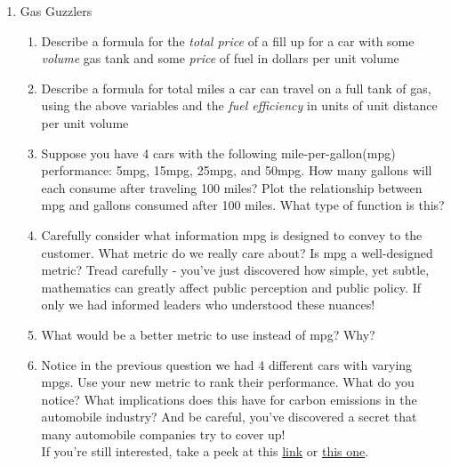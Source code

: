 \documentclass{article}
\begin{document}
\begin{enumerate}
    \item Gas Guzzlers
    \begin{enumerate}
        \item Describe a formula for the \textit{total price} of a fill up for a car with some  \textit{volume} gas tank and some  \textit{price} of fuel in dollars per unit volume
        \item Describe a formula for total miles a car can travel on a full tank of gas, using the above variables and the \textit{fuel efficiency} in units of unit distance per unit volume
        \item Suppose you have 4 cars with the following mile-per-gallon(mpg) performance: 5mpg, 15mpg, 25mpg, and 50mpg. How many gallons will each consume after traveling 100 miles? Plot the relationship between mpg and gallons consumed after 100 miles. What type of function is this?
        \item Carefully consider what information mpg is designed to convey to the customer. What metric do we really care about? Is mpg a well-designed metric? Tread carefully - you've just discovered how simple, yet subtle, mathematics can greatly affect public perception and public policy. If only we had informed leaders who understood these nuances!
        \item What would be a better metric to use instead of mpg? Why?
        \item Notice in the previous question we had 4 different cars with varying mpgs. Use your new metric to rank their performance. What do you notice? What implications does this have for carbon emissions in the automobile industry? And be careful, you've discovered a secret that many automobile companies try to cover up!\\
        If you're still interested, take a peek at this \href{https://www.washingtonpost.com/news/wonk/wp/2013/06/06/want-to-boost-fuel-economy-stop-thinking-about-miles-per-gallon/?noredirect=on&utm_term=.0db47fa5ed5b}{link} or \href{https://nudges.wordpress.com/why-we-misunderstand-what-miles-per-gallon-ratings-are-telling-us/}{this one}.
    \end{enumerate}
    

\end{enumerate}
\end{document}
